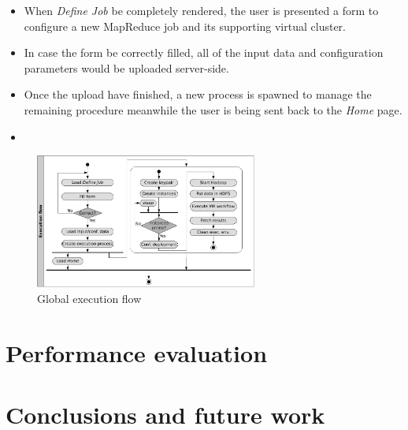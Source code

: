 \documentclass{sig-alternate}
\begin{document}
\begin{itemize}
 \item When \emph{Define Job} be completely rendered, the user is presented a form to configure a new MapReduce job and its supporting virtual cluster.
 
 \item In case the form be correctly filled, all of the input data and configuration parameters would be uploaded server-side.
 
 \item Once the upload have finished, a new process is spawned to manage the remaining procedure meanwhile the user is being sent back to the \emph{Home} page.
 
 \item
\end{itemize}


\begin{figure}[tbp]
\centering
\includegraphics[width=0.65\textwidth]{img/006}
\caption{Global execution flow}
\label{fig:exflow}
\end{figure}



\section{Performance evaluation}\label{sec:performance}
\noindent


\section{Conclusions and future work}\label{sec:conclusions}
\noindent





\appendix
\end{document}
